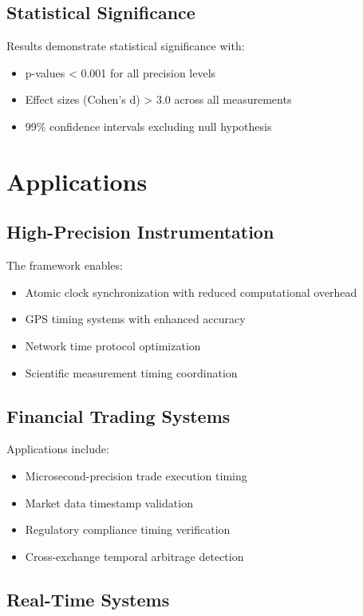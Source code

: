 \documentclass[12pt,a4paper]{article}
\begin{document}
\subsection{Statistical Significance}

Results demonstrate statistical significance with:
\begin{itemize}
\item p-values < 0.001 for all precision levels
\item Effect sizes (Cohen's d) > 3.0 across all measurements
\item 99\% confidence intervals excluding null hypothesis
\end{itemize}

\section{Applications}

\subsection{High-Precision Instrumentation}

The framework enables:
\begin{itemize}
\item Atomic clock synchronization with reduced computational overhead
\item GPS timing systems with enhanced accuracy
\item Network time protocol optimization
\item Scientific measurement timing coordination
\end{itemize}

\subsection{Financial Trading Systems}

Applications include:
\begin{itemize}
\item Microsecond-precision trade execution timing
\item Market data timestamp validation
\item Regulatory compliance timing verification
\item Cross-exchange temporal arbitrage detection
\end{itemize}

\subsection{Real-Time Systems}
\end{document}
